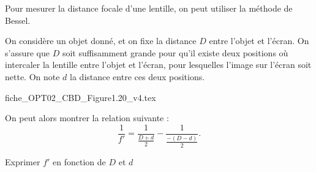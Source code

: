 \finEntrainement



\newpage




\hauteurLargeurCadreReponse		{8mm}{5cm}
\typeEntrainement				{} %
\initialisationEntrainement

Pour mesurer la distance focale d'une lentille, on peut utiliser la méthode de Bessel. 

On considère un objet donné, et on fixe la distance $D$ entre l'objet et l'écran. On s'assure que $D$ soit suffisamment grande pour qu'il existe deux positions où intercaler la lentille entre l'objet et l'écran, pour lesquelles l'image sur l'écran soit nette. On note $d$ la distance entre ces deux positions.

\begin{center}
{fiche_OPT02_CBD_Figure1.20_v4.tex}
\end{center}

On peut alors montrer la relation suivante : 
\[
\frac{1}{f'}=\frac{1}{\frac{D+d}{2}}-\frac{1}{\frac{-(D-d)}{2}}.
\]

\debutEntrainement


\begin{enonce}
Exprimer $f'$ en fonction de $D$ et $d$
\end{enonce}

